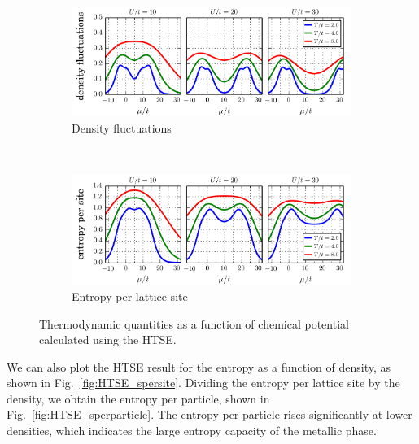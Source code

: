 \begin{figure}
        \begin{subfigure}[b]{0.48\textwidth}
                \includegraphics[width=\textwidth]{../figures/lda_evap/HTSE_densfluc_U.png}
                \caption{Density fluctuations}
\label{fig:HTSEhomogeneousC}
        \end{subfigure}
        ~
        \begin{subfigure}[b]{0.48\textwidth}
                \includegraphics[width=\textwidth]{../figures/lda_evap/HTSE_entropy_U.png}
                \caption{Entropy per lattice site}
\label{fig:HTSEhomogeneousD}
        \end{subfigure}
        \caption{\small Thermodynamic quantities as a function of chemical potential calculated using the HTSE.}
\label{fig:HTSEhomogeneous}
\end{figure}


We can also plot the HTSE result for the entropy as a function of density, as
shown in Fig.~\ref{fig:HTSE_spersite}.  Dividing the entropy per lattice site
by the density, we obtain the entropy per particle, shown in
Fig.~\ref{fig:HTSE_sperparticle}.  The entropy per particle rises significantly
at lower densities, which indicates the large entropy capacity of the metallic
phase. 

